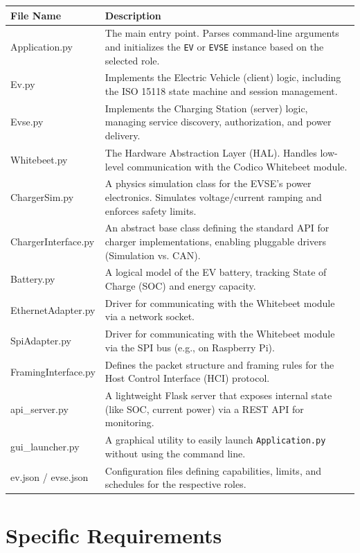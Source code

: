 \documentclass[a4paper,11pt]{report}
\begin{document}
\begin{center}
\begin{tabular}{ |l|p{10cm}| } 
\hline
\textbf{File Name} & \textbf{Description} \\
\hline
Application.py & The main entry point. Parses command-line arguments and initializes the \texttt{EV} or \texttt{EVSE} instance based on the selected role. \\ 
\hline
Ev.py & Implements the Electric Vehicle (client) logic, including the ISO 15118 state machine and session management. \\
\hline
Evse.py & Implements the Charging Station (server) logic, managing service discovery, authorization, and power delivery. \\
\hline
Whitebeet.py & The Hardware Abstraction Layer (HAL). Handles low-level communication with the Codico Whitebeet module. \\
\hline
ChargerSim.py & A physics simulation class for the EVSE's power electronics. Simulates voltage/current ramping and enforces safety limits. \\
\hline
ChargerInterface.py & An abstract base class defining the standard API for charger implementations, enabling pluggable drivers (Simulation vs. CAN). \\
\hline
Battery.py & A logical model of the EV battery, tracking State of Charge (SOC) and energy capacity. \\
\hline
EthernetAdapter.py & Driver for communicating with the Whitebeet module via a network socket. \\
\hline
SpiAdapter.py & Driver for communicating with the Whitebeet module via the SPI bus (e.g., on Raspberry Pi). \\
\hline
FramingInterface.py & Defines the packet structure and framing rules for the Host Control Interface (HCI) protocol. \\
\hline
api\_server.py & A lightweight Flask server that exposes internal state (like SOC, current power) via a REST API for monitoring. \\
\hline
gui\_launcher.py & A graphical utility to easily launch \texttt{Application.py} without using the command line. \\
\hline
ev.json / evse.json & Configuration files defining capabilities, limits, and schedules for the respective roles. \\
\hline
\end{tabular}
\end{center}

\chapter{Specific Requirements}
\end{document}
